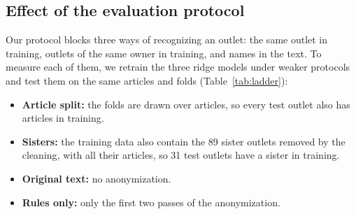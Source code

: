 \documentclass[11pt,a4paper]{article}
\begin{document}
\subsection{Effect of the evaluation protocol}\label{sec:ladder}
Our protocol blocks three ways of recognizing an outlet: the same outlet in training, outlets of the same owner in
training, and names in the text. To measure each of them, we retrain the three ridge models under weaker protocols and
test them on the same articles and folds (Table~\ref{tab:ladder}):
\begin{itemize}
  \item \textbf{Article split:} the folds are drawn over articles, so every test outlet also has articles in training.
  \item \textbf{Sisters:} the training data also contain the 89 sister outlets removed by the cleaning, with all their
        articles, so 31 test outlets have a sister in training.
  \item \textbf{Original text:} no anonymization.
  \item \textbf{Rules only:} only the first two passes of the anonymization.
\end{itemize}
\end{document}
